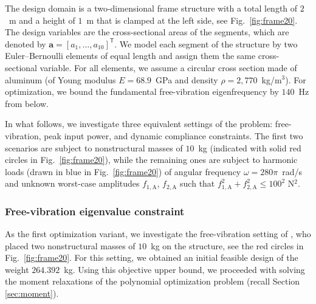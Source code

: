 \documentclass[preprint,3p]{elsarticle}
\newcommand{\T}{^{\mathsf T}}
\newcommand{\A}{\mathrm{A}}
\numberwithin{equation}{section}
\begin{document}
The design domain is a two-dimensional frame structure with a total length of $2$~m and a height of $1$~m that is clamped at the left side, see Fig.~\ref{fig:frame20}. The design variables are the cross-sectional areas of the segments, which are denoted by $\mathbf{a} = [a_1, \dots, a_{10}]\T$. We model each segment of the structure by two Euler--Bernoulli elements of equal length and assign them the same cross-sectional variable. For all elements, we assume a circular cross section made of aluminum (of Young modulus $E=68.9$~GPa and density $\rho=2,770$~kg/m$^3$). For optimization, we bound the fundamental free-vibration eigenfrequency by $140$~Hz from below.

In what follows, we investigate three equivalent settings of the problem: free-vibration, peak input power, and dynamic compliance constraints. The first two scenarios are subject to nonstructural masses of $10$~kg (indicated with solid red circles in Fig.~\ref{fig:frame20}), while the remaining ones are subject to harmonic loads (drawn in blue in Fig.~\ref{fig:frame20}) of angular frequency $\omega=280\pi$~rad/s and unknown worst-case amplitudes $f_{1,\A}$, $f_{2,\A}$ such that $f_{1,\A}^2 + f_{2,\A}^2 \le 100^2$ N$^2$.

\subsubsection{Free-vibration eigenvalue constraint}

As the first optimization variant, we investigate the free-vibration setting of \citet{Ni2014}, who placed two nonstructural masses of $10$~kg on the structure, see the red circles in Fig.~\ref{fig:frame20}. For this setting, we obtained an initial feasible design of the weight $264.392$~kg. Using this objective upper bound, we proceeded with solving the moment relaxations of the polynomial optimization problem (recall Section \ref{sec:moment}).
\end{document}
